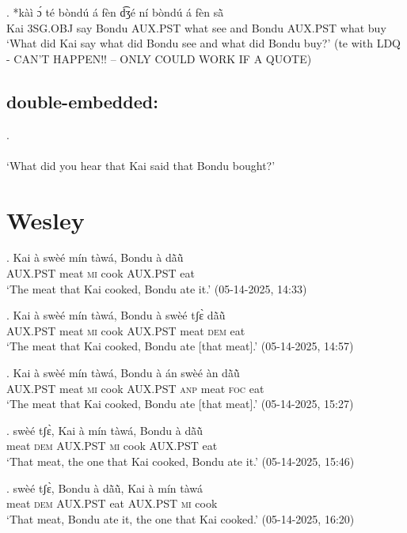 \documentclass{assets/fieldnotes}
\begin{document}
\exg. *kàì ɔ́ té bòndú á fèn d͡ʒé ní bòndú á fèn sã̀\\
Kai 3SG.OBJ say Bondu AUX.PST what see and Bondu AUX.PST what buy\\
`What did Kai say what did Bondu see and what did Bondu buy?' (te with LDQ - CAN'T HAPPEN!! -- ONLY COULD WORK IF A QUOTE)

\subsection{double-embedded:}

\exg. \\
\\
`What did you hear that Kai said that Bondu bought?' \\ 

\section{Wesley}

\exg. Kai à swèé mín tàwá, Bondu à dã̀ũ̀\\
{} \textsc{AUX.PST} meat \textsc{mi} cook {} \textsc{AUX.PST} eat\\
`The meat that Kai cooked, Bondu ate it.’ \hfill{(05-14-2025, 14:33)}

\exg. Kai à swèé mín tàwá, Bondu à swèé tʃɛ̀ dã̀ũ̀\\
{} \textsc{AUX.PST} meat \textsc{mi} cook {} \textsc{AUX.PST} meat \textsc{dem} eat\\
`The meat that Kai cooked, Bondu ate [that meat].’ \hfill{(05-14-2025, 14:57)}

\exg. Kai à swèé mín tàwá, Bondu à án swèé àn dã̀ũ̀\\
{} \textsc{AUX.PST} meat \textsc{mi} cook {}  \textsc{AUX.PST} \textsc{anp} meat \textsc{foc} eat\\
`The meat that Kai cooked, Bondu ate [that meat].’ \hfill{(05-14-2025, 15:27)}

\exg. swèé tʃɛ̀, Kai à mín tàwá, Bondu à dã̀ũ̀\\
meat \textsc{dem} {} \textsc{AUX.PST} \textsc{mi} cook {} \textsc{AUX.PST} eat\\
`That meat, the one that Kai cooked, Bondu ate it.’ \hfill{(05-14-2025, 15:46)}

\exg. swèé tʃɛ̀, Bondu à dã̀ũ̀, Kai à mín tàwá \\
meat \textsc{dem} {} \textsc{AUX.PST} eat {} \textsc{AUX.PST} \textsc{mi} cook \\
`That meat, Bondu ate it, the one that Kai cooked.’ \hfill{(05-14-2025, 16:20)}
\end{document}

